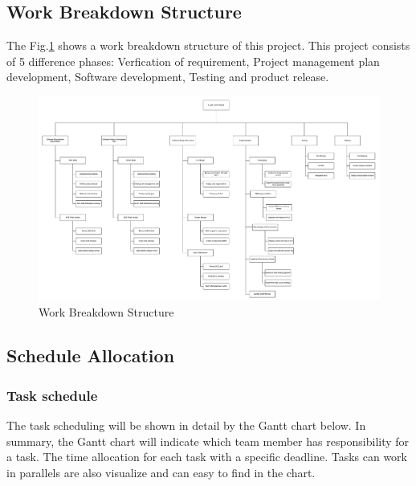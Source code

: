 	\subsection{Work Breakdown Structure}
The Fig.\ref{work-breakdown-structure} shows a work breakdown structure of this project. This project consists of 5 difference phases: Verfication of requirement, Project management plan development, Software development, Testing and product release. 
	\begin{figure}[H]
		\centering
		\hspace*{-1.3in}
		\includegraphics[width=1.5\linewidth]{WorkBreakDown_s.PNG}  %
		\caption{Work Breakdown Structure}
		\label{work-breakdown-structure}
	\end{figure}
\subsection{Schedule Allocation}
\subsubsection{Task schedule}
The task scheduling will be shown in detail by the Gantt chart below. In summary, the Gantt chart will indicate which team member has responsibility for a task. The time allocation for each task with a specific  deadline. Tasks can work in parallels are also visualize and can easy to find in the chart.     
